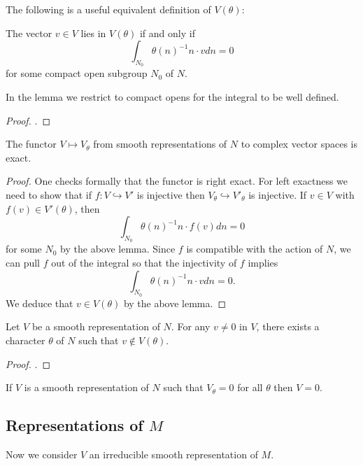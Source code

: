 The following is a useful equivalent definition of $V(\theta)$:

\begin{lemma}\label{criteria N}
    The vector $v \in V$ lies in $V(\theta)$ if and only if 
    $$\int_{N_0} \theta(n)^{-1}  n \cdot v dn = 0$$
    for some compact open subgroup $N_0$ of $N$.
\end{lemma}
In the lemma we restrict to compact opens for the integral to be well defined.

\begin{proof}
    \cite[Lemma 8.1]{BH1}.
\end{proof}

\begin{cor}\label{exact}
    The functor $V \mapsto V_\theta$ from smooth representations of $N$ to complex vector spaces is exact.
\end{cor}
\begin{proof}
    One checks formally that the functor is right exact. For left exactness we need to show that if $f: V \hookrightarrow V'$ is injective then $V_\theta \hookrightarrow V'_\theta$ is injective. If $v \in V$ with $f(v) \in V'(\theta)$, then 
    $$\int_{N_0} \theta(n)^{-1}n \cdot f(v) dn = 0$$
    for some $N_0$ by the above lemma. Since $f$ is compatible with the action of $N$, we can pull $f$ out of the integral so that the injectivity of $f$ implies
    $$\int_{N_0} \theta(n)^{-1}n \cdot v dn = 0.$$
    We deduce that $v \in V(\theta)$ by the above lemma.
\end{proof}

\begin{prop}
    Let $V$ be a smooth representation of $N$. For any $v \neq 0$ in $V$, there exists a character $\theta$ of $N$ such that $v \not\in V(\theta)$.
\end{prop}
\begin{proof}
    \cite[Proposition 8.1]{BH1}.
\end{proof}

\begin{cor}\label{character}
    If $V$ is a smooth representation of $N$ such that $V_\theta=0$ for all $\theta$ then $V=0$.
\end{cor}


\subsection{Representations of \texorpdfstring{$M$}{TEXT}}

Now we consider $V$ an irreducible smooth representation of $M$. 

